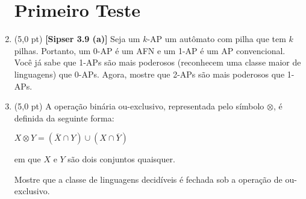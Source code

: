 \documentclass[12pt,a4paper,oneside]{article}
\begin{document}
\begin{enumerate}
	
	\section*{Primeiro Teste}
	
	\item (5,0 pt) {\bf [Sipser 3.9 (a)]} Seja um $k$-AP um autômato com pilha que tem $k$ pilhas. Portanto, um 0-AP é um AFN e um 1-AP é um AP convencional. Você já sabe que 1-APs são mais poderosos (reconhecem uma classe maior de linguagens) que 0-APs. Agora, mostre que 2-APs são mais poderosos que 1-APs.
	
	\item (5,0 pt) A operação binária ou-exclusivo, representada pelo símbolo $\otimes$, é definida da seguinte forma:
	\begin{center}
		$X \otimes Y = (\overline{X} \cap Y) \cup (X \cap \overline{Y})$
	\end{center}
	em que $X$ e $Y$ são dois conjuntos quaisquer.
	
	Mostre que a classe de linguagens decidíveis é fechada sob a operação de ou-exclusivo.

\end{enumerate}
\end{document}
